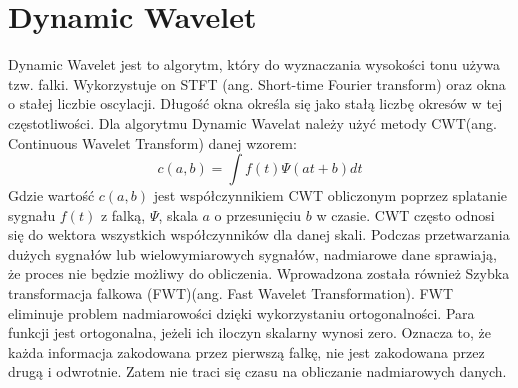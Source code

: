  \section{{Dynamic Wavelet}}
 Dynamic Wavelet \cite{harvey} jest to algorytm, który do wyznaczania wysokości tonu używa tzw. falki. Wykorzystuje on STFT (ang. Short-time Fourier transform) oraz okna o stałej liczbie oscylacji. Długość okna określa się jako stałą liczbę okresów w tej częstotliwości.
 Dla algorytmu Dynamic Wavelat należy użyć metody CWT(ang. Continuous Wavelet Transform) danej wzorem:
\begin{equation}
\label{equation:1}
    c(a, b) = \int f(t) \Psi (at + b)dt
\end{equation}
Gdzie wartość  $c(a, b)$ jest współczynnikiem CWT  obliczonym poprzez splatanie sygnału $f(t)$ z falką, $\Psi$, skala $a$ o przesunięciu $b$ w czasie.
CWT często odnosi się do wektora wszystkich współczynników dla danej skali.
Podczas przetwarzania dużych sygnałów lub wielowymiarowych sygnałów, nadmiarowe dane sprawiają, że proces nie będzie możliwy do obliczenia. Wprowadzona została również Szybka transformacja falkowa (FWT)(ang. Fast Wavelet Transformation). FWT eliminuje problem nadmiarowości dzięki wykorzystaniu ortogonalności. Para funkcji jest ortogonalna, jeżeli ich iloczyn skalarny wynosi zero. Oznacza to, że każda informacja zakodowana przez pierwszą falkę, nie jest zakodowana przez drugą i odwrotnie. Zatem nie traci  się czasu na obliczanie nadmiarowych danych.
